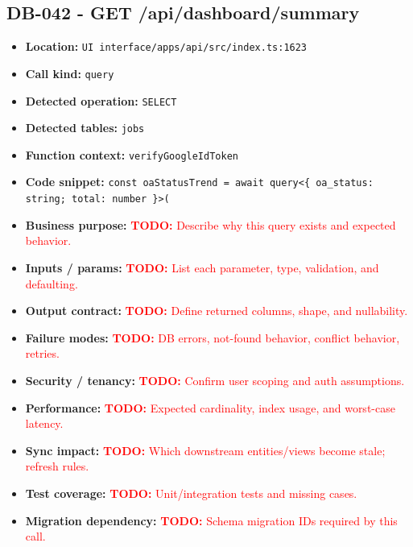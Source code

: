 \documentclass[11pt]{article}
\newcommand{\todoitem}[1]{\textcolor{red}{\textbf{TODO:} #1}}
\begin{document}
\subsection{DB-042 - GET /api/dashboard/summary}
\begin{itemize}[leftmargin=1.5em]
\item \textbf{Location:} \texttt{UI interface/apps/api/src/index.ts:1623}
\item \textbf{Call kind:} \texttt{query}
\item \textbf{Detected operation:} \texttt{SELECT}
\item \textbf{Detected tables:} \texttt{jobs}
\item \textbf{Function context:} \texttt{verifyGoogleIdToken}
\item \textbf{Code snippet:} \texttt{const oaStatusTrend = await query<\{ oa\_status: string; total: number \}>(}
\item \textbf{Business purpose:} \todoitem{Describe why this query exists and expected behavior.}
\item \textbf{Inputs / params:} \todoitem{List each parameter, type, validation, and defaulting.}
\item \textbf{Output contract:} \todoitem{Define returned columns, shape, and nullability.}
\item \textbf{Failure modes:} \todoitem{DB errors, not-found behavior, conflict behavior, retries.}
\item \textbf{Security / tenancy:} \todoitem{Confirm user scoping and auth assumptions.}
\item \textbf{Performance:} \todoitem{Expected cardinality, index usage, and worst-case latency.}
\item \textbf{Sync impact:} \todoitem{Which downstream entities/views become stale; refresh rules.}
\item \textbf{Test coverage:} \todoitem{Unit/integration tests and missing cases.}
\item \textbf{Migration dependency:} \todoitem{Schema migration IDs required by this call.}
\end{itemize}
\end{document}

